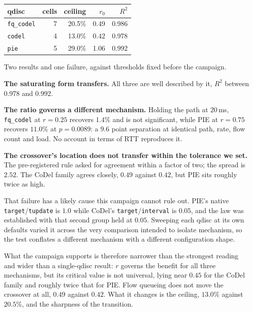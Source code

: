 \begin{center}
\small
\begin{tabular}{lrrrr}
\hline
qdisc & cells & ceiling & $r_0$ & $R^2$ \\
\hline
\texttt{fq\_codel} & 7 & 20.5\% & 0.49 & 0.986 \\
\texttt{codel} & 4 & 13.0\% & 0.42 & 0.978 \\
\texttt{pie} & 5 & 29.0\% & 1.06 & 0.992 \\
\hline
\end{tabular}
\end{center}

Two results and one failure, against thresholds fixed before the campaign.

\textbf{The saturating form transfers.} All three are well described by it,
$R^2$ between 0.978 and 0.992.

\textbf{The ratio governs a different mechanism.} Holding the path at
$20$\,ms, \texttt{fq\_codel} at $r = 0.25$ recovers $1.4\%$ and is not
significant, while PIE at $r = 0.75$ recovers $11.0\%$ at $p = 0.0089$: a
$9.6$ point separation at identical path, rate, flow count and load. No
account in terms of RTT reproduces it.

\textbf{The crossover's location does not transfer within the tolerance we
set.} The pre-registered rule asked for agreement within a factor of two; the
spread is $2.52$. The CoDel family agrees closely, $0.49$ against $0.42$, but
PIE sits roughly twice as high.

That failure has a likely cause this campaign cannot rule out. PIE's native
\texttt{target}/\texttt{tupdate} is $1.0$ while CoDel's
\texttt{target}/\texttt{interval} is $0.05$, and the law was established with
that second group held at $0.05$. Sweeping each qdisc at its own defaults
varied it across the very comparison intended to isolate mechanism, so the
test conflates a different mechanism with a different configuration shape.

What the campaign supports is therefore narrower than the strongest reading
and wider than a single-qdisc result: $r$ governs the benefit for all three
mechanisms, but its critical value is not universal, lying near $0.45$ for the
CoDel family and roughly twice that for PIE. Flow queueing does not move the
crossover at all, $0.49$ against $0.42$. What it changes is the ceiling,
$13.0\%$ against $20.5\%$, and the sharpness of the transition.
